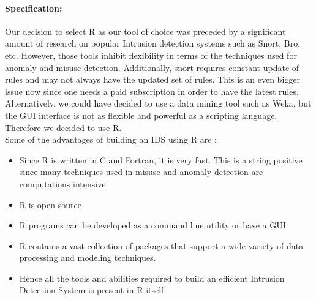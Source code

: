 \documentclass{report}
\begin{document}
	
	
\paragraph{Specification:\\}
Our decision to select R as our tool of choice was preceded by a significant amount of research on popular Intrusion detection systems such as Snort, Bro, etc. However, those tools inhibit flexibility in terms of the techniques used for anomaly and misuse detection. Additionally, snort requires constant update of rules and may not always have the updated set of rules. This is an even bigger issue now since one needs a paid subscription in order to have the latest rules.
 Alternatively, we could have decided to use a data mining tool such as Weka, but the GUI interface is not as flexible and powerful as a scripting language. Therefore we decided to use R.\\ 



Some of the advantages of building an IDS using R are :
\begin{itemize}
  \item Since R is written in C and Fortran, it is very fast. This is a string positive since many techniques used in misuse and anomaly detection are computations intensive
  \item R is open source
  \item R programs can be developed as a command line utility or have a GUI
  \item R contains a vast collection of packages that support a wide variety of data processing and modeling techniques.
  \item Hence all the tools and abilities required to build an efficient Intrusion Detection System is present in R itself
\end{itemize}
  

\end{document}
